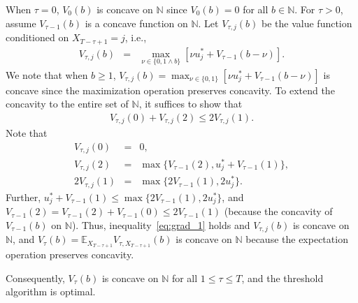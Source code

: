 When $\tau = 0$,
$V_0(b)$ is concave on $\mathbb{N}$ since $V_0 (b) = 0$ for all $b \in \mathbb{N}$. For $\tau > 0$, assume $V_{\tau-1}(b)$ is a concave function on $\mathbb{N}$. Let $V_{\tau,j}(b)$ be the value function conditioned on $X_{T-\tau+1} = j$, i.e.,
\begin{eqnarray}
V_{\tau,j}(b) &=& \max_{\nu \in \{0, 1\land b\}} [\nu u_j^* + V_{\tau-1}(b - \nu)].
\end{eqnarray}
We note that when $b \geq 1$, $V_{\tau,j}(b) = \max_{\nu \in \{0, 1\}} [\nu u_j^* + V_{\tau-1}(b - \nu)]$ is concave since the maximization operation preserves concavity. To extend the concavity to the entire set of $\mathbb{N}$, it suffices to show that
\begin{eqnarray}\label{eq:grad_1}
V_{\tau,j}(0) + V_{\tau,j}(2) \leq 2V_{\tau,j}(1).
\end{eqnarray}
Note that
\begin{eqnarray}
V_{\tau,j}(0) &=& 0, \nonumber \\
V_{\tau,j}(2) &=& \max\{V_{\tau-1}(2), u_j^* + V_{\tau-1}(1)\}, \nonumber\\
2V_{\tau,j}(1) & = & \max\{2V_{\tau-1}(1), 2u_j^*  \} \nonumber.
\end{eqnarray}
Further, $u_j^* + V_{\tau-1}(1) \leq \max\{2V_{\tau-1}(1), 2u_j^*  \}$, and $V_{\tau-1}(2) = V_{\tau-1}(2) + V_{\tau-1}(0)\leq 2V_{\tau-1}(1)$ (because the concavity of $V_{\tau-1}(b)$ on $\mathbb{N}$). Thus, inequality~\eqref{eq:grad_1} holds and $V_{\tau,j}(b)$ is concave on $\mathbb{N}$, and $V_{\tau}(b) = \mathbb{E}_{X_{T-\tau+1}}V_{\tau,X_{T-\tau+1}}(b)$ is concave on  $\mathbb{N}$ because the expectation operation preserves concavity.

Consequently, $V_{\tau}(b)$ is concave on $\mathbb{N}$ for all $1 \leq \tau \leq T$, and the threshold algorithm is optimal.
